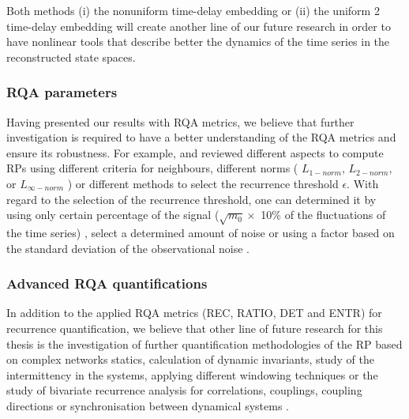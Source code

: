 Both methods (i) the nonuniform time-delay embedding or
(ii) the uniform 2 time-delay embedding will create another line of 
our future research in order to have nonlinear tools that describe 
better the dynamics of the time series in the reconstructed state spaces.


\subsubsection{RQA parameters}
Having presented our results with RQA metrics, we believe that further 
investigation is required to have a better understanding of the RQA metrics
and ensure its robustness. For example, \cite{marwan2007} and 
\cite{marwan2015} reviewed different aspects to 
compute RPs using different criteria for neighbours, 
different norms ( $L_{1-norm}$, $L_{2-norm}$, or $L_{\infty-norm}$ ) or 
different methods to select the recurrence threshold $\epsilon$.
With regard to the selection of the recurrence threshold, one can
determined it by using only certain percentage of the signal
($\sqrt{m_0} \times$ 10\% of the fluctuations of the time series)
\cite{letellier2006}, select a determined amount of noise or 
using a factor based on the standard deviation of the 
observational noise \cite{marwan2007}.

%



\subsubsection{Advanced RQA quantifications}
In addition to the applied RQA metrics (REC, RATIO, DET and ENTR) for 
recurrence quantification, 
we believe that other line of future research for this thesis is the 
investigation of further quantification methodologies of the RP based 
on complex networks statics, calculation of dynamic invariants, 
study of the intermittency in the systems, applying different windowing 
techniques or the study of bivariate recurrence analysis for correlations, 
couplings, coupling directions or synchronisation between dynamical systems
\citep{marwan2007, marwan2015}.





%




